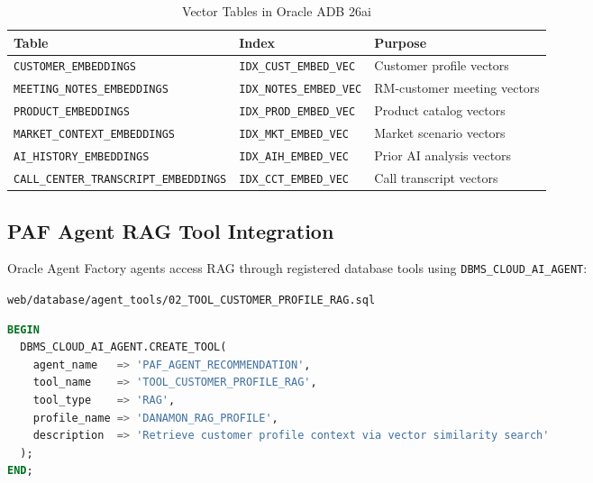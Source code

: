 \documentclass[12pt,a4paper]{article}
\begin{document}
\begin{table}[H]
\centering
\caption{Vector Tables in Oracle ADB 26ai}
\label{tab:vector-tables}
\begin{tabularx}{\textwidth}{l l X}
\toprule
\textbf{Table} & \textbf{Index} & \textbf{Purpose} \\
\midrule
\texttt{CUSTOMER\_EMBEDDINGS} & \texttt{IDX\_CUST\_EMBED\_VEC} & Customer profile vectors \\
\texttt{MEETING\_NOTES\_EMBEDDINGS} & \texttt{IDX\_NOTES\_EMBED\_VEC} & RM-customer meeting vectors \\
\texttt{PRODUCT\_EMBEDDINGS} & \texttt{IDX\_PROD\_EMBED\_VEC} & Product catalog vectors \\
\texttt{MARKET\_CONTEXT\_EMBEDDINGS} & \texttt{IDX\_MKT\_EMBED\_VEC} & Market scenario vectors \\
\texttt{AI\_HISTORY\_EMBEDDINGS} & \texttt{IDX\_AIH\_EMBED\_VEC} & Prior AI analysis vectors \\
\texttt{CALL\_CENTER\_TRANSCRIPT\_EMBEDDINGS} & \texttt{IDX\_CCT\_EMBED\_VEC} & Call transcript vectors \\
\bottomrule
\end{tabularx}
\end{table}

\subsection{PAF Agent RAG Tool Integration}

Oracle Agent Factory agents access RAG through registered database tools using \texttt{DBMS\_CLOUD\_AI\_AGENT}:

\texttt{web/database/agent\_tools/02\_TOOL\_CUSTOMER\_PROFILE\_RAG.sql}

\begin{lstlisting}[language=SQL, caption={PAF RAG tool registration}]
BEGIN
  DBMS_CLOUD_AI_AGENT.CREATE_TOOL(
    agent_name   => 'PAF_AGENT_RECOMMENDATION',
    tool_name    => 'TOOL_CUSTOMER_PROFILE_RAG',
    tool_type    => 'RAG',
    profile_name => 'DANAMON_RAG_PROFILE',
    description  => 'Retrieve customer profile context via vector similarity search'
  );
END;
\end{lstlisting}
\end{document}
